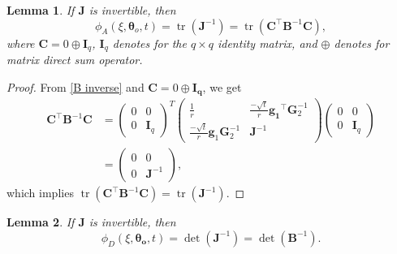 \documentclass[
]{book}
\newtheorem{lemma}{Lemma}[chapter]
\theoremstyle{definition}
\theoremstyle{definition}
\theoremstyle{definition}
\theoremstyle{definition}
\theoremstyle{remark}
\begin{document}
\begin{lemma}
\protect\hypertarget{lem:loss-A}{}\label{lem:loss-A}If \(\boldsymbol{J}\) is invertible, then
\begin{equation*}
  \phi_A(\xi,\boldsymbol{\theta}_o,t)=\operatorname{tr}(\boldsymbol{J}^{-1})=\operatorname{tr}(\boldsymbol{C}^\top\boldsymbol{B}^{-1}\boldsymbol{C}),
  \end{equation*}
where \(\boldsymbol{C}=0\oplus \boldsymbol{I}_q\), \(\boldsymbol{I}_q\) denotes for the \(q\times q\) identity matrix, and \(\oplus\) denotes for matrix direct sum operator.
\end{lemma}

\begin{proof}
From \eqref{B inverse} and \(\boldsymbol{C}=0\oplus \boldsymbol{I_q}\), we get
\begin{align*}
    \boldsymbol{C}^\top\boldsymbol{B}^{-1}\boldsymbol{C}&=  \begin{pmatrix}
                                0   &   0\\
                                0   &   \boldsymbol{I}_q
                                \end{pmatrix}^T\begin{pmatrix}
            \frac{1}{r}             &   \frac{-\sqrt{t}}{r}\boldsymbol{g_1}^\top\boldsymbol{G}_2^{-1}   \\
            \frac{-\sqrt{t}}{r}\boldsymbol{g}_1\boldsymbol{G}_2^{-1}    &\boldsymbol{J}^{-1}
            \end{pmatrix}\begin{pmatrix}
                                0   &   0\\
                                0   &   \boldsymbol{I}_q
                                \end{pmatrix}\\
                            &= \begin{pmatrix}
                                0   &   0\\
                                0   &   \boldsymbol{J}^{-1}
                                \end{pmatrix},
    \end{align*}
which implies \(\operatorname{tr}(\boldsymbol{C}^\top\boldsymbol{B}^{-1}\boldsymbol{C})=\operatorname{tr}(\boldsymbol{J}^{-1})\).
\end{proof}

\begin{lemma}
\protect\hypertarget{lem:loss-D}{}\label{lem:loss-D}If \(\boldsymbol{J}\) is invertible, then
\begin{equation*}
    \phi_D(\xi,\boldsymbol{\theta_o},t)=\det(\boldsymbol{J}^{-1})=\det(\boldsymbol{B}^{-1}).
\end{equation*}
\end{lemma}
\end{document}
